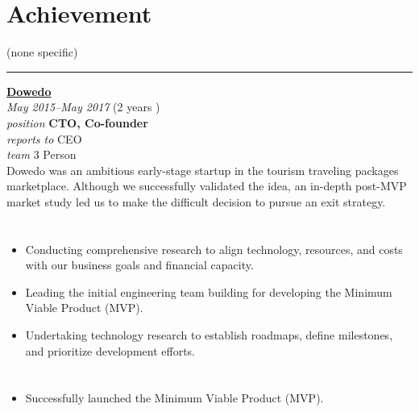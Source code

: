 \documentclass[12pt]{res}
\begin{document}
\begin{resume}
\begin{minipage}[t]{0.42\linewidth}
	\section{Achievement}
	\begin{flushleft}
        \footnotesize{\vspace{2.6pt}
(none specific)}
	\end{flushleft}
\end{minipage}

\vspace{10pt}
\rule{1.0\textwidth}{0.1pt}

\begin{multicols}{2}
	{\large {\bf \href{https://dowedo.id}{Dowedo}}} \\
	{\footnotesize{\sl May 2015--May 2017} \hfill (2 years )}\\
	{\footnotesize{\sl position} \hfill \bf{CTO, Co-founder}}\\
	{\footnotesize{\sl reports to} \hfill CEO}\\
	{\footnotesize{\sl team} \hfill 3 Person}\\

	\columnbreak
	{\footnotesize{Dowedo was an ambitious early-stage startup in the tourism traveling packages marketplace. Although we successfully validated the idea, an in-depth post-MVP market study led us to make the difficult decision to pursue an exit strategy.}}\\
\end{multicols}
\vspace{-20pt}

\begin{multicols}{2}
	\section{}
		\begin{itemize}
			\item Conducting comprehensive research to align technology, resources, and costs with our business goals and financial capacity.
\item Leading the initial engineering team building for developing the Minimum Viable Product (MVP).
\item Undertaking technology research to establish roadmaps, define milestones, and prioritize development efforts.
		\end{itemize}
	\section{}
		\begin{itemize}
			\setlength{\itemindent}{0pt}
			\item Successfully launched the Minimum Viable Product (MVP).
		\end{itemize}
\end{multicols}


\end{resume}
\end{document}
